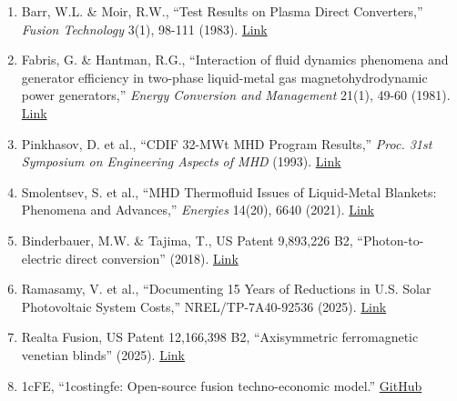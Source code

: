 \documentclass{article}
\begin{document}
\begin{enumerate}
  Options for Congress,'' Congressional Research Service, R41419 (2010).
  \href{https://www.everycrsreport.com/reports/R41419.html}{Link}
\item Barr, W.L. \& Moir, R.W., ``Test Results on Plasma Direct
  Converters,'' \emph{Fusion Technology} 3(1), 98-111 (1983).
  \href{https://doi.org/10.13182/FST83-A20820}{Link}
\item Fabris, G. \& Hantman, R.G., ``Interaction of fluid dynamics phenomena
  and generator efficiency in two-phase liquid-metal gas
  magnetohydrodynamic power generators,'' \emph{Energy Conversion and
  Management} 21(1), 49-60 (1981).
  \href{https://doi.org/10.1016/0196-8904(81)90006-6}{Link}
\item Pinkhasov, D. et al., ``CDIF 32-MWt MHD Program Results,'' \emph{Proc.
  31st Symposium on Engineering Aspects of MHD} (1993).
  \href{https://www.osti.gov/biblio/6380343}{Link}
\item Smolentsev, S. et al., ``MHD Thermofluid Issues of Liquid-Metal
  Blankets: Phenomena and Advances,'' \emph{Energies} 14(20), 6640
  (2021). \href{https://doi.org/10.3390/en14206640}{Link}
\item Binderbauer, M.W. \& Tajima, T., US Patent 9,893,226 B2,
  ``Photon-to-electric direct conversion'' (2018).
  \href{https://patents.google.com/patent/US9893226B2/}{Link}
\item Ramasamy, V. et al., ``Documenting 15 Years of Reductions in U.S.
  Solar Photovoltaic System Costs,'' NREL/TP-7A40-92536 (2025).
  \href{https://docs.nrel.gov/docs/fy25osti/92536.pdf}{Link}
\item Realta Fusion, US Patent 12,166,398 B2, ``Axisymmetric ferromagnetic
  venetian blinds'' (2025).
  \href{https://patents.google.com/patent/US12166398B2}{Link}
\item 1cFE, ``1costingfe: Open-source fusion techno-economic model.''
  \href{https://github.com/1cfe/1costingfe}{GitHub}
\end{enumerate}
\end{document}
